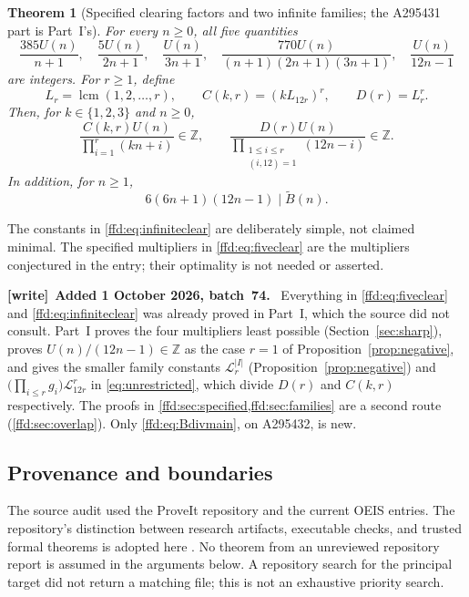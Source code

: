 \documentclass[11pt]{article}
\newtheorem{theorem}{Theorem}[section]
\theoremstyle{definition}
\theoremstyle{remark}
\newcommand{\Z}{\mathbb Z}
\newcommand{\lcm}{\operatorname{lcm}}
\newcommand{\LL}{\mathcal L}
\newcommand{\tB}{\widetilde B}
\newenvironment{writenote}[1][]{\par\smallskip\begingroup\small
 \noindent\textbf{[write]}\if\relax\detokenize{#1}\relax\else~\textbf{#1.}\fi\ }%
 {\par\endgroup\smallskip}
\begin{document}
\begin{theorem}[Specified clearing factors and two infinite families; the
A295431 part is Part~I's]
\label{ffd:thm:clearing-main}
For every $n\ge0$, all five quantities
\begin{equation}
 \frac{385U(n)}{n+1},\quad
 \frac{5U(n)}{2n+1},\quad
 \frac{U(n)}{3n+1},\quad
 \frac{770U(n)}{(n+1)(2n+1)(3n+1)},\quad
 \frac{U(n)}{12n-1}
 \label{ffd:eq:fiveclear}
\end{equation}
are integers. For $r\ge1$, define
\[
 L_r=\lcm(1,2,\ldots,r),\qquad
 C(k,r)=(kL_{12r})^r,\qquad D(r)=L_r^r.
\]
Then, for $k\in\{1,2,3\}$ and $n\ge0$,
\begin{equation}
 \frac{C(k,r)U(n)}{\prod_{i=1}^{r}(kn+i)}\in\Z,
 \qquad
 \frac{D(r)U(n)}{
   \displaystyle\prod_{\substack{1\le i\le r\\(i,12)=1}}(12n-i)}\in\Z.
 \label{ffd:eq:infiniteclear}
\end{equation}
In addition, for $n\ge1$,
\begin{equation}
 6(6n+1)(12n-1)\mid \tB(n).
 \label{ffd:eq:Bdivmain}
\end{equation}
\end{theorem}
The constants in \eqref{ffd:eq:infiniteclear} are deliberately simple, not claimed
minimal. The specified multipliers in \eqref{ffd:eq:fiveclear} are the multipliers
conjectured in the entry; their optimality is not needed or asserted.

\begin{writenote}[Added 1 October 2026, batch~74]
Everything in \eqref{ffd:eq:fiveclear} and \eqref{ffd:eq:infiniteclear} was
already proved in Part~I, which the source did not consult. Part~I proves the
four multipliers least possible (Section~\ref{sec:sharp}), proves
$U(n)/(12n-1)\in\Z$ as the case $r=1$ of Proposition~\ref{prop:negative}, and gives the
smaller family constants $\LL_r^{|I|}$ (Proposition~\ref{prop:negative}) and
$\bigl(\prod_{i\le r}g_i\bigr)\LL_{12r}^{r}$ in \eqref{eq:unrestricted}, which
divide $D(r)$ and $C(k,r)$ respectively. The proofs in
\cref{ffd:sec:specified,ffd:sec:families} are a second route
(\cref{ffd:sec:overlap}). Only \eqref{ffd:eq:Bdivmain}, on A295432, is new.
\end{writenote}

\subsection{Provenance and boundaries}
The source audit used the ProveIt repository and the current OEIS entries.
The repository's distinction between research artifacts, executable checks,
and trusted formal theorems is adopted here \cite{ffd-proveit}. No theorem from
an unreviewed repository report is assumed in the arguments below. A repository
search for the principal target did not return a matching file; this is not
an exhaustive priority search.
\end{document}
